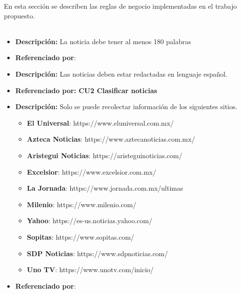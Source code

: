 

En esta sección se describen las reglas de negocio implementadas en el trabajo propuesto.\\\\


\begin{itemize}
  \item \textbf{Descripción:}  La noticia debe tener al menos 180 palabras
  \item \textbf{Referenciado por}: 
\end{itemize}


\begin{itemize}
  \item \textbf{Descripción:} Las noticias deben estar redactadas en lenguaje español.
  \item \textbf{Referenciado por: CU2 Clasificar noticias}  \\
\end{itemize}

\begin{itemize}
  \item \textbf{Descripción:} Solo se puede recolectar información de los siguientes sitios.\\

  \begin{itemize}

    \item \textbf{El Universal}: https://www.eluniversal.com.mx/
    \item \textbf{Azteca Noticias}: https://www.aztecanoticias.com.mx/
    \item \textbf{Aristegui Noticias}: https://aristeguinoticias.com/
    \item \textbf{Excelsior}: https://www.excelsior.com.mx/
    \item \textbf{La Jornada}: https://www.jornada.com.mx/ultimas
    \item \textbf{Milenio}: https://www.milenio.com/
    \item \textbf{Yahoo}: https://es-us.noticias.yahoo.com/
    \item \textbf{Sopitas}: https://www.sopitas.com/
    \item \textbf{SDP Noticias}: https://www.sdpnoticias.com/
    \item \textbf{Uno TV}: https://www.unotv.com/inicio/

  \end{itemize} 
  \item \textbf{Referenciado por}:  \\
\end{itemize}

